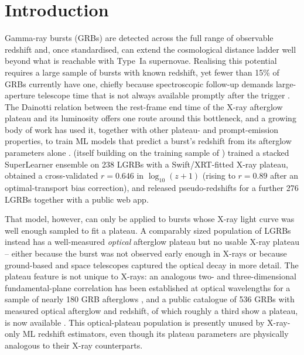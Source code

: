 \documentclass{aa}
\newcommand{\logz}{\log_{10}(z+1)}
\begin{document}
\maketitle

\section{Introduction}
\label{sec:intro}

Gamma-ray bursts (GRBs) are detected across the full range of observable
redshift and, once standardised, can extend the cosmological distance ladder
well beyond what is reachable with Type~Ia supernovae. Realising this
potential requires a large sample of bursts with known redshift, yet fewer
than 15\% of GRBs currently have one, chiefly because spectroscopic follow-up
demands large-aperture telescope time that is not always available promptly
after the trigger \citep{narendra2025}. The Dainotti relation between the
rest-frame end time of the X-ray afterglow plateau and its luminosity offers
one route around this bottleneck, and a growing body of work has used it,
together with other plateau- and prompt-emission properties, to train ML
models that predict a burst's redshift from its afterglow parameters alone
\citep{narendra2025}. \citet{narendra2025} (itself building on the training
sample of \citealt{dainotti2024c}) trained a stacked SuperLearner ensemble on
238 LGRBs with a Swift/XRT-fitted X-ray plateau, obtained a cross-validated
$r=0.646$ in $\logz$ (rising to $r=0.89$ after an optimal-transport bias
correction), and released pseudo-redshifts for a further 276 LGRBs together
with a public web app.

That model, however, can only be applied to bursts whose X-ray light curve
was well enough sampled to fit a plateau. A comparably sized population of
LGRBs instead has a well-measured \emph{optical} afterglow plateau but no
usable X-ray plateau -- either because the burst was not observed early
enough in X-rays or because ground-based and space telescopes captured the
optical decay in more detail. The plateau feature is not unique to X-rays: an
analogous two- and three-dimensional fundamental-plane correlation has been
established at optical wavelengths for a sample of nearly 180 GRB afterglows
\citep{dainotti2022optical}, and a public catalogue of 536 GRBs with measured
optical afterglow and redshift, of which roughly a third show a plateau, is
now available \citep{dainotti2024a}. This optical-plateau population is
presently unused by X-ray-only ML redshift estimators, even though its
plateau parameters are physically analogous to their X-ray counterparts.
\end{document}
